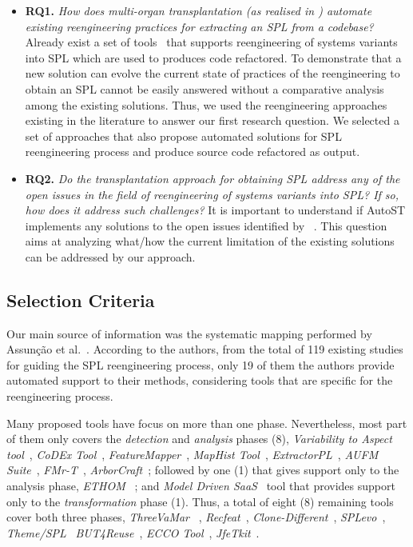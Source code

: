 \begin{itemize}
    \item \textbf{RQ1.} \emph{How does multi-organ transplantation (as realised in \FOUNDRY) automate existing reengineering practices for extracting an SPL from a codebase?} Already exist a set of tools~\cite{Assuncao2017} that supports reengineering of systems variants into SPL which are used to produces code refactored. To demonstrate that a new solution can evolve the current state of practices of the reengineering to obtain an SPL cannot be easily answered without a comparative analysis among the existing solutions. Thus, we used the reengineering approaches existing in the literature to answer our first research question. We selected a set of approaches that also propose automated solutions for SPL reengineering process and produce source code refactored as output. 

    \item \textbf{RQ2.} \emph{Do the transplantation approach for obtaining SPL address any of the open issues in the field of reengineering of systems variants into SPL? If so, how does it address such challenges?} It is important to understand if AutoST implements any solutions to the open issues identified by ~\cite{Assuncao2017}. This question aims at analyzing what/how the current limitation of the existing solutions can be addressed by our approach. 
\end{itemize}

\subsection{Selection Criteria}

Our main source of information was the systematic mapping performed by Assunção et al.~\cite{Assuncao2017}. According to the authors, from the total of 119 existing studies for guiding the SPL reengineering process, only 19 of them the authors provide automated support to their methods, considering tools that are specific for the reengineering process.

Many proposed tools have focus on more than one phase. Nevertheless, most part of them only covers the \emph{detection} and \emph{analysis} phases (8), \emph{Variability to Aspect tool}~\cite{Alves2007}, \emph{CoDEx Tool}~\cite{Trifu2010}, \emph{FeatureMapper}~\cite{Heidenreich2008,Seidl2012}, \emph{MapHist Tool}~\cite{Nunes2014}, \emph{ExtractorPL}~\cite{Ziadi2012}, \emph{AUFM Suite}~\cite{Bagheri2011}, \emph{FMr-T}~\cite{Mazoun2014}, \emph{ArborCraft}~\cite{Weston2009}; followed by one (1) that gives support only to the analysis phase, \emph{ETHOM} ~\cite{Nunes2012}; and \emph{Model Driven SaaS}~\cite{Mohamed2014} tool that provides support only to the \emph{transformation} phase (1). Thus, a total of eight (8) remaining tools cover both three phases, \emph{ThreeVaMar}
~\cite{Rubin2010}, \emph{Recfeat}~\cite{Nunes2012}, \emph{Clone-Different}~\cite{Xue2011}, \emph{SPLevo}~\cite{Klatt2014}, \emph{Theme/SPL}~\cite{Araujo2013} \emph{BUT4Reuse}~\cite{Martinez2014}, \emph{ECCO Tool}~\cite{Fischer2015}, \emph{JfeTkit}~\cite{Tang2015}. 

